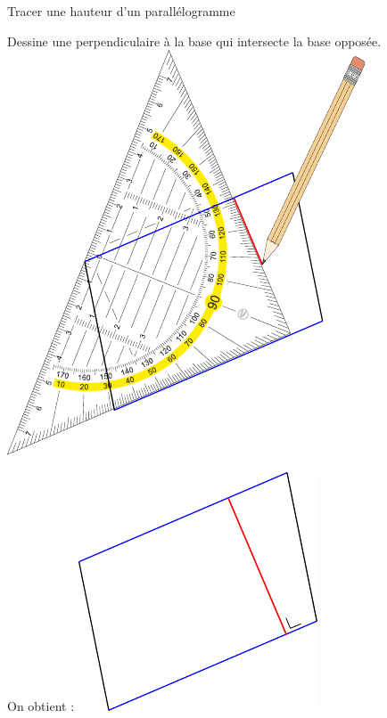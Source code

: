 \documentclass[a4paper,11pt]{report}
\let\oldcenter\center
\let\oldendcenter\endcenter
\renewenvironment{center}{\setlength\topsep{-10pt}\oldcenter}{\oldendcenter}
\begin{document}
\begin{resolu}{Tracer une hauteur d'un parallélogramme}
{\begin{tasks}[column-sep=10pt]
    \task Dessine une perpendiculaire à la base qui intersecte la base opposée.
    \begin{center} \includegraphics[scale=.9]{media/gm-01/parallelogramme3bis} \end{center}

    \task On obtient :
    \begin{center} \includegraphics[scale=0.9]{media/gm-01/parallelogramme4}
    \end{center}
\end{tasks}

}
\end{resolu}
\end{document}
